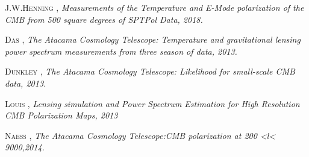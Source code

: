 \documentclass[a4paper]{article}
\begin{document}
 \textsc{J.W.Henning },
\textit{Measurements of the Temperature and E-Mode polarization of the CMB from 500 square degrees of SPTPol Data, 2018.}

 \textsc{Das },
\textit{The Atacama Cosmology Telescope: Temperature and gravitational lensing power spectrum measurements from three season of data, 2013.}

 \textsc{Dunkley },
\textit{The Atacama Cosmology Telescope: Likelihood for small-scale CMB data, 2013.}

\textsc{Louis },
\textit{Lensing simulation and Power Spectrum Estimation for High Resolution CMB Polarization Maps, 2013}

 \textsc{Naess },
\textit{The Atacama Cosmology Telescope:CMB polarization at 200 <l< 9000,2014.}

\end{document}
